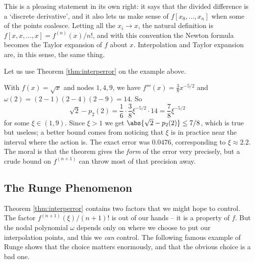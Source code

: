 \begin{remark}
  This is a pleasing statement in its own right: it says that the divided difference is a `discrete derivative', and it also lets us make sense of $f[x_0, \dots, x_n]$ when some of the points coalesce. Letting all the $x_i \to x$, the natural definition is $f[x, x, \dots, x] = f^{(n)}(x)/n!$, and with this convention the Newton formula becomes the Taylor expansion of $f$ about $x$. Interpolation and Taylor expansion are, in this sense, the same thing.
\end{remark}

Let us use Theorem \ref{thm:interperror} on the example above.

\begin{example}
  With $f(x) = \sqrt{x}$ and nodes $1, 4, 9$, we have $f'''(x) = \tfrac{3}{8}x^{-5/2}$ and $\omega(2) = (2-1)(2-4)(2-9) = 14$. So
  $$
  \sqrt{2} - p_2(2) = \frac{1}{6}\cdot \frac{3}{8}\xi^{-5/2}\cdot 14 = \frac{7}{8}\xi^{-5/2}
  $$
  for some $\xi \in (1,9)$. Since $\xi > 1$ we get $\abs{\sqrt 2 - p_2(2)} \le 7/8$, which is true but useless; a better bound comes from noticing that $\xi$ is in practice near the interval where the action is. The exact error was $0.0476$, corresponding to $\xi \approx 2.2$. The moral is that the theorem gives the \emph{form} of the error very precisely, but a crude bound on $f^{(n+1)}$ can throw most of that precision away.
\end{example}

\subsection{The Runge Phenomenon}

Theorem \ref{thm:interperror} contains two factors that we might hope to control. The factor $f^{(n+1)}(\xi)/(n+1)!$ is out of our hands -- it is a property of $f$. But the nodal polynomial $\omega$ depends only on where we choose to put our interpolation points, and this we \emph{can} control. The following famous example of Runge shows that the choice matters enormously, and that the obvious choice is a bad one.

